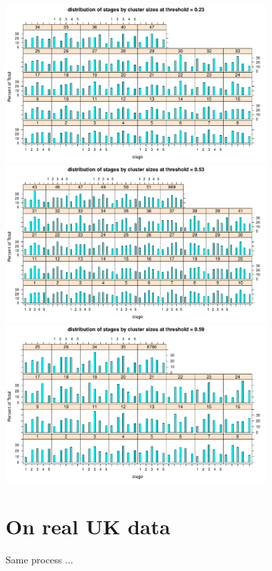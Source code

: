 \documentclass[]{revtex4}\usepackage[]{graphicx}\usepackage[]{color}
\newenvironment{knitrout}{}{} %
\begin{document}
\begin{enumerate}
\begin{knitrout}
{\centering \includegraphics[width=10cm]{figure/plotlattice-1} 
\includegraphics[width=10cm]{figure/plotlattice-2} 
\includegraphics[width=10cm]{figure/plotlattice-3} 

}



\end{knitrout}


\end{enumerate}

\section{On real UK data}
Same process ...
\end{document}
